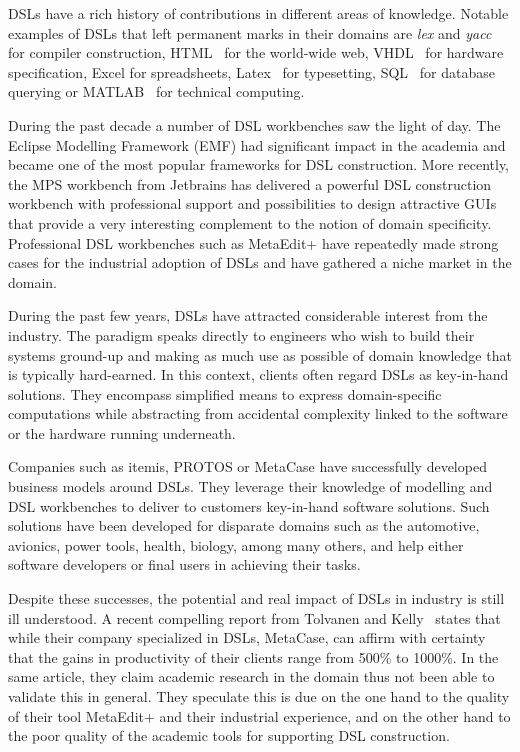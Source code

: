 \documentclass{scrartcl}
\begin{document}
DSLs have a rich history of contributions in different areas of knowledge.
Notable examples of DSLs that left permanent marks in their domains are
\emph{lex} and \emph{yacc}~\cite{Johnson80} for compiler construction,
HTML~\cite{BernersLee96} for the world-wide web, VHDL~\cite{Ashenden02} for
hardware specification, Excel for spreadsheets, Latex~\cite{Lamport1989} for
typesetting, SQL~\cite{Codd70} for database querying or MATLAB~\cite{Gilat07}
for technical computing.

During the past decade a number of DSL workbenches saw the light of day. The
Eclipse Modelling Framework (EMF) had significant impact in the academia and
became one of the most popular frameworks for DSL construction. More recently,
the MPS workbench from Jetbrains has delivered a powerful DSL construction
workbench with professional support and possibilities to design attractive GUIs
that provide a very interesting complement to the notion of domain specificity.
Professional DSL workbenches such as MetaEdit+ have repeatedly made strong cases
for the industrial adoption of DSLs and have gathered a niche market in the
domain.

During the past few years, DSLs have attracted considerable interest from the
industry. The paradigm speaks directly to engineers who wish to build their
systems ground-up and making as much use as possible of domain knowledge that is
typically hard-earned. In this context, clients often regard DSLs as key-in-hand
solutions. They encompass simplified means to express domain-specific
computations while abstracting from accidental complexity linked to the software or the hardware
running underneath.

Companies such as itemis, PROTOS or MetaCase have successfully developed
business models around DSLs. They leverage their knowledge of modelling and DSL workbenches to
deliver to customers key-in-hand software solutions. Such solutions have been
developed for disparate domains such as the automotive, avionics, power tools,
health, biology, among many others, and help either software developers or final
users in achieving their tasks.

Despite these successes, the potential and real impact of DSLs in industry is
still ill understood. A recent compelling report from Tolvanen and
Kelly~\cite{Tolvanen016} states that while their company specialized in
DSLs, MetaCase, can affirm with certainty that the gains in productivity of
their clients range from 500\% to 1000\%. In the same article, they claim
academic research in the domain thus not been able to validate this in general.
They speculate this is due on the one hand to the quality of their tool
MetaEdit+ and their industrial experience, and on the other hand to the poor
quality of the academic tools for supporting DSL construction.
\end{document}
